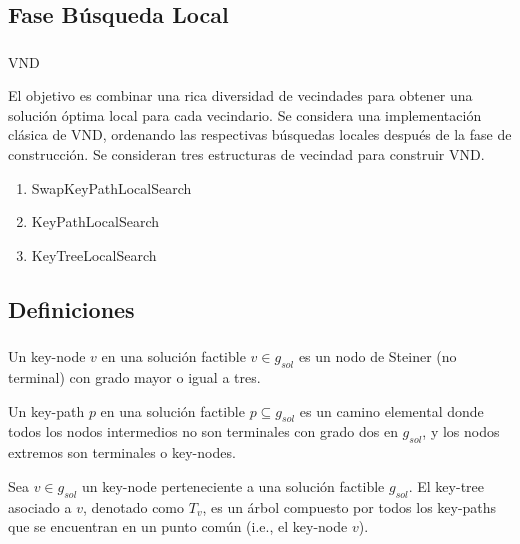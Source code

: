 \subsection{Fase Búsqueda Local}
\begin{frame}\frametitle{}
\begin{block}{VND}
\begin{small}
El objetivo es combinar una rica diversidad de vecindades para obtener una solución óptima local para cada vecindario. Se considera una implementación clásica de VND, ordenando las respectivas búsquedas locales después de la fase de construcción. Se consideran tres estructuras de vecindad para construir VND.
\begin{enumerate}
 \item SwapKeyPathLocalSearch
 \item KeyPathLocalSearch
 \item KeyTreeLocalSearch
\end{enumerate} 
\end{small}
\end{block}
\end{frame}

\subsection{Definiciones}
\begin{frame}\frametitle{}
\begin{definition}
Un key-node $v$ en una solución factible $v \in g_{sol}$ es un nodo de Steiner (no terminal) con grado mayor o igual a tres.
\end{definition}
\begin{definition}
Un key-path $p$ en una solución factible $p \subseteq g_{sol}$ es un camino elemental 
donde todos los nodos intermedios no son terminales con grado dos en $g_{sol}$, 
y los nodos extremos son terminales o key-nodes.
\end{definition}
\begin{definition}
Sea $v \in g_{sol}$ un key-node perteneciente a una solución factible $g_{sol}$. 
El key-tree asociado a $v$, denotado como $T_v$, es un árbol compuesto por todos los 
key-paths que se encuentran en un punto común (i.e., el key-node $v$).
\end{definition}
\end{frame}

